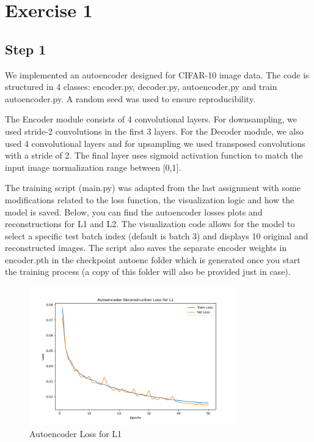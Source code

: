 

\section{Exercise 1}
\subsection{Step 1}

We implemented an autoencoder designed for CIFAR-10 image data. The code is structured in 4 classes: encoder.py, decoder.py, autoencoder,py and train autoencoder.py. A random seed was used to ensure reproducibility.

The Encoder module consists of 4 convolutional layers. For downsampling, we used stride-2 convolutions in the first 3 layers. For the Decoder module, we also used 4 convolutional layers and for upsampling we used transposed convolutions with a stride of 2. The final layer uses sigmoid activation function to match the input image normalization range between [0,1].

The training script (main.py) was adapted from the last assignment with some modifications related to the loss function, the visualization logic and how the model is saved. Below, you can find the autoencoder losses plots and reconstructions for L1 and L2. The visualization code allows for the model to select a specific test batch index (default is batch 3) and displays 10 original and reconstructed images. The script also saves the separate encoder weights in encoder.pth in the checkpoint autoenc folder which is generated once you start the training process (a copy of this folder will also be provided just in case).

\begin{figure}[H] 
    \centering
    \includegraphics[width=0.8\textwidth]{images/ex_1/ex1_autoencoder_loss_l1} 
    \caption{Autoencoder Loss for L1}
\end{figure}

